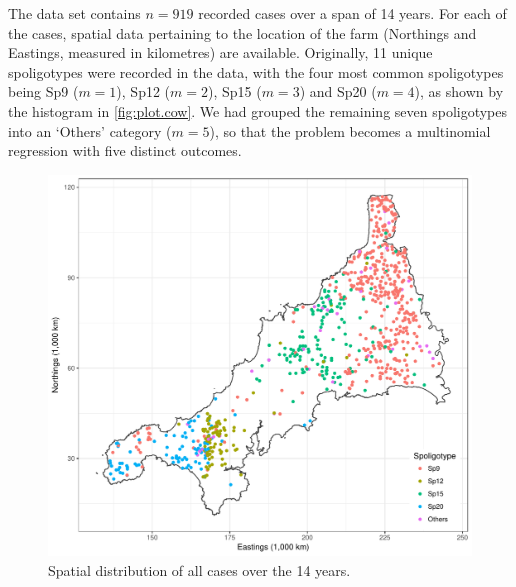 \documentclass[showframe,11pt]{report}\usepackage[]{graphicx}\usepackage{xcolor}
\newenvironment{knitrout}{}{} %
\begin{document}
The data set contains $n=919$ recorded cases over a span of 14 years.
For each of the cases, spatial data pertaining to the location of the farm (Northings and Eastings, measured in kilometres) are available.
Originally, 11 unique spoligotypes were recorded in the data, with the four most common spoligotypes being Sp9 ($m=1$), Sp12 ($m=2$), Sp15 ($m=3$) and Sp20 ($m=4$), as shown by the histogram in \cref{fig:plot.cow}.
We had grouped the remaining seven spoligotypes into an `Others' category ($m=5$), so that the problem becomes a multinomial regression with five distinct outcomes.

\begin{knitrout}
\color{fgcolor}\begin{figure}[htb]

{\centering \includegraphics[width=\linewidth]{figure/05-plot_cornwall-1} 

}

\caption[Spatial distribution of all cases over the 14 years]{Spatial distribution of all cases over the 14 years.}\label{fig:plot.cornwall}
\end{figure}


\end{knitrout}
\end{document}
